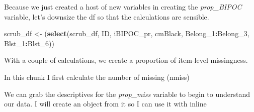 \documentclass[
  11pt,
]{book}
\newenvironment{Shaded}{\begin{snugshade}}{\end{snugshade}}
\newcommand{\AttributeTok}[1]{\textcolor[rgb]{0.27,0.27,0.27}{#1}}
\newcommand{\CommentTok}[1]{\textcolor[rgb]{0.37,0.37,0.37}{\textit{#1}}}
\newcommand{\DecValTok}[1]{\textcolor[rgb]{0.06,0.06,0.06}{#1}}
\newcommand{\FunctionTok}[1]{\textcolor[rgb]{0.27,0.27,0.27}{\textbf{#1}}}
\newcommand{\NormalTok}[1]{#1}
\newcommand{\OtherTok}[1]{\textcolor[rgb]{0.37,0.37,0.37}{#1}}
\newcommand{\SpecialCharTok}[1]{\textcolor[rgb]{0.43,0.43,0.43}{\textbf{#1}}}
\begin{document}
Because we just created a host of new variables in creating the \emph{prop\_BIPOC} variable, let's downsize the df so that the calculations are sensible.

\begin{Shaded}
\begin{Highlighting}[]
\NormalTok{scrub\_df }\OtherTok{\textless{}{-}}\NormalTok{ (}\FunctionTok{select}\NormalTok{(scrub\_df, ID, iBIPOC\_pr, cmBlack, Belong\_1}\SpecialCharTok{:}\NormalTok{Belong\_3,}
\NormalTok{    Blst\_1}\SpecialCharTok{:}\NormalTok{Blst\_6))}
\end{Highlighting}
\end{Shaded}

With a couple of calculations, we create a proportion of item-level missingness.

In this chunk I first calculate the number of missing (nmiss)

\begin{Shaded}
\end{Shaded}

We can grab the descriptives for the \emph{prop\_miss} variable to begin to understand our data. I will create an object from it so I can use it with inline

\begin{Shaded}
\end{Shaded}
\end{document}
